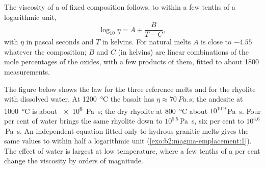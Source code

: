 \begin{proposition}\label{prop:b2:magma-emplacement:vft}
The viscosity of a  of fixed composition follows, to within a few
tenths of a logarithmic unit,
\[
\log_{10}\eta = A + \frac{B}{T - C},
\]
with $\eta$ in pascal seconds and $T$ in kelvins. For natural melts $A$ is close
to $-4.55$ whatever the composition; $B$ and $C$ (in kelvins) are linear
combinations of the mole percentages of the oxides, with a few products of them,
fitted to about \num{1800} measurements.
\end{proposition}
\admitted

The figure below shows the law for the three reference melts and for the
rhyolite with dissolved water. At \qty{1200}{\celsius} the basalt has
$\eta \approx \qty{70}{Pa.s}$; the andesite at \qty{1000}{\celsius} is about
\qty{e6}{Pa.s}; the dry rhyolite at \qty{800}{\celsius} about $10^{10.9}$\,\unit{Pa.s}.
Four per cent of water brings the same rhyolite down to $10^{5.5}$\,\unit{Pa.s}, six
per cent to $10^{4.6}$\,\unit{Pa.s}. An independent equation fitted only to hydrous
granitic melts gives the same values to within half a logarithmic unit
(\cref{exo:b2:magma-emplacement:1}). The effect of water is largest at low temperature, where a few
tenths of a per cent change the viscosity by orders of magnitude.

